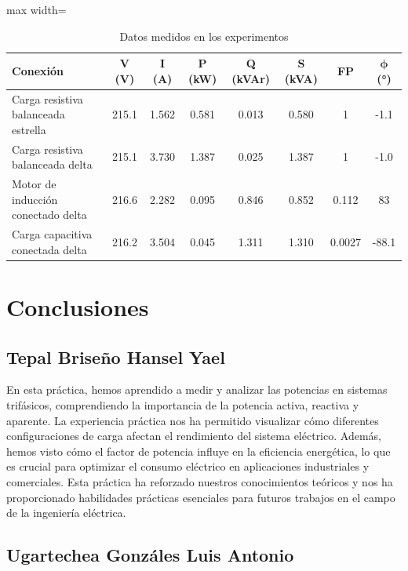 \documentclass[12pt, letterpaper]{article}
\begin{document}
\begin{table}[H]
	\centering
	\small %
	\begin{adjustbox}{max width=\textwidth}
		\begin{tabular}{|l|c|c|c|c|c|c|c|}
			\hline
			\textbf{Conexión} & \textbf{V (V)} & \textbf{I (A)} & \textbf{P (kW)} & \textbf{Q (kVAr)} & \textbf{S (kVA)} & \textbf{FP} & \(\boldsymbol{\phi}\) (°) \\
			\hline
			Carga resistiva balanceada estrella & 215.1 & 1.562 & 0.581 & 0.013 & 0.580 & 1 & -1.1 \\
			\hline
			Carga resistiva balanceada delta & 215.1 & 3.730 & 1.387 & 0.025 & 1.387 & 1 & -1.0 \\
			\hline
			Motor de inducción conectado delta & 216.6 & 2.282 & 0.095 & 0.846 & 0.852 & 0.112 & 83 \\
			\hline
			Carga capacitiva conectada delta & 216.2 & 3.504 & 0.045 & 1.311 & 1.310 & 0.0027 & -88.1 \\
			\hline
		\end{tabular}
	\end{adjustbox}
	\caption{Datos medidos en los experimentos}
\end{table}

\section{Conclusiones}

\subsection{Tepal Briseño Hansel Yael}

En esta práctica, hemos aprendido a medir y analizar las potencias en sistemas trifásicos, comprendiendo la importancia de la potencia activa, reactiva y aparente. La experiencia práctica nos ha permitido visualizar cómo diferentes configuraciones de carga afectan el rendimiento del sistema eléctrico. Además, hemos visto cómo el factor de potencia influye en la eficiencia energética, lo que es crucial para optimizar el consumo eléctrico en aplicaciones industriales y comerciales. Esta práctica ha reforzado nuestros conocimientos teóricos y nos ha proporcionado habilidades prácticas esenciales para futuros trabajos en el campo de la ingeniería eléctrica.

\subsection{Ugartechea Gonzáles Luis Antonio}
\end{document}

